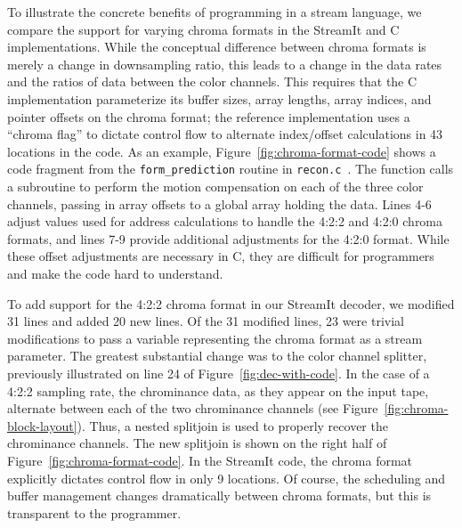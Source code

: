 \label{section:chroma}

To illustrate the concrete benefits of programming in a stream
language, we compare the support for varying chroma formats in the
StreamIt and C implementations.  While the conceptual difference
between chroma formats is merely a change in downsampling ratio, this
leads to a change in the data rates and the ratios of data between the
color channels. This requires that the C implementation parameterize
its buffer sizes, array lengths, array indices, and pointer offsets on
the chroma format; the reference implementation uses a ``chroma flag''
to dictate control flow to alternate index/offset calculations in 43
locations in the code. As an example,
Figure~\ref{fig:chroma-format-code} shows a code fragment from the
\texttt{form\_prediction} routine in
\texttt{recon.c}~\cite{reference-mpeg-c}. The function calls a
subroutine to perform the motion compensation on each of the three
color channels, passing in array offsets to a global array holding the
data. Lines 4-6 adjust values used for address calculations to handle
the 4:2:2 and 4:2:0 chroma formats, and lines 7-9 provide additional
adjustments for the 4:2:0 format. While these offset adjustments are
necessary in C, they are difficult for programmers and make the code
hard to understand.

To add support for the 4:2:2 chroma format in our StreamIt decoder, we
modified 31 lines and added 20 new lines. Of the 31 modified lines, 23
were trivial modifications to pass a variable representing the chroma
format as a stream parameter. The greatest substantial change was to
the color channel splitter, previously illustrated on line 24 of
Figure~\ref{fig:dec-with-code}. In the case of a 4:2:2 sampling rate,
the chrominance data, as they appear on the input tape, alternate
between each of the two chrominance channels (see
Figure~\ref{fig:chroma-block-layout}). Thus, a nested splitjoin is used
to properly recover the chrominance channels. The new splitjoin is
shown on the right half of Figure~\ref{fig:chroma-format-code}.  In
the StreamIt code, the chroma format explicitly dictates control flow
in only 9 locations. Of course, the scheduling and buffer management
changes dramatically between chroma formats, but this is transparent
to the programmer.

